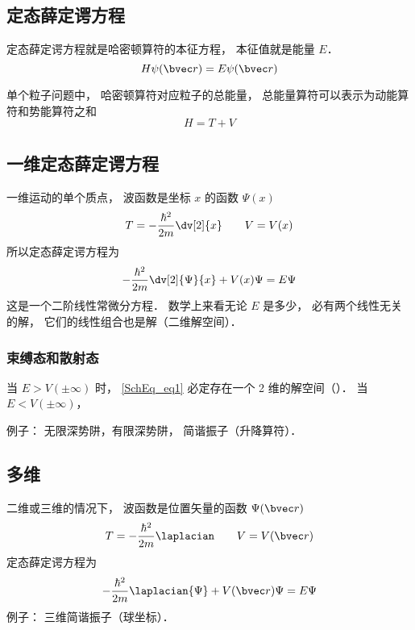 
\begin{issues}
\issueTODO
\issueAbstract
\end{issues}


\subsection{定态薛定谔方程}
定态薛定谔方程就是哈密顿算符的本征方程， 本征值就是能量 $E$．
\begin{equation}
H \psi(\bvec r) = E \psi(\bvec r)
\end{equation}

单个粒子问题中， 哈密顿算符对应粒子的总能量， 总能量算符可以表示为动能算符和势能算符之和
\begin{equation}
H = T + V
\end{equation}

\subsection{一维定态薛定谔方程}
一维运动的单个质点， 波函数是坐标 $x$ 的函数 $\Psi(x)$
\begin{equation}
T = -\frac{\hbar^2}{2m} \dv[2]{x} \qquad V = V(x)
\end{equation}
所以定态薛定谔方程为
\begin{equation}\label{SchEq_eq1}
-\frac{\hbar^2}{2m} \dv[2]{\Psi}{x} + V(x)\Psi = E \Psi
\end{equation}
这是一个二阶线性常微分方程． 数学上来看无论 $E$ 是多少， 必有两个线性无关的解， 它们的线性组合也是解（二维解空间）． 

\subsubsection{束缚态和散射态}
当 $E > V(\pm \infty)$ 时， \autoref{SchEq_eq1} 必定存在一个 2 维的解空间（）．%
当 $E < V(\pm \infty)$，

例子： 无限深势阱，有限深势阱， 简谐振子（升降算符）．

\subsection{多维}
二维或三维的情况下， 波函数是位置矢量的函数 $\Psi(\bvec r)$
\begin{equation}
T = -\frac{\hbar^2}{2m} \laplacian \qquad V = V(\bvec r)
\end{equation}
定态薛定谔方程为
\begin{equation}
-\frac{\hbar^2}{2m} \laplacian {\Psi} + V(\bvec r)\Psi = E \Psi
\end{equation}
例子： 三维简谐振子（球坐标）．

